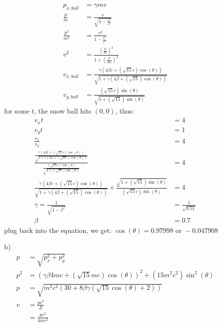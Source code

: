 \documentclass{article}
\begin{document}
\begin{itemize}
\begin{itemize}
        \begin{align*}
            p_{x,ball}&=\gamma mv\\
            \frac{p}{m}&=\frac{v}{\sqrt{1-\frac{v^2}{c^2}}}\\
            \frac{p^2}{m^2}&=\frac{v^2}{1-\frac{v^2}{c^2}}\\
            v^2&=\frac{\left(\frac{p}{m}\right)^2}{1+\left(\frac{p}{mc}\right)^2}\\
            v_{x,ball}&=\frac{\gamma\left(4\beta c+\left(\sqrt{15}c\right)\cos(\theta)\right)}{\sqrt{1+\gamma\left(4\beta+\left(\sqrt{15}\right)\cos(\theta)\right)}}\\
            v_{y,ball}&=\frac{\left(\sqrt{15}c\right)\sin(\theta)}{\sqrt{1+\left(\sqrt{15}\right)\sin(\theta)}}
        \end{align*}
        for some \(t\), the snow ball hits \((0,0)\), thus:
        \begin{align*}
            v_xt&=4\\
            v_yt&=1\\
            \frac{v_x}{v_y}&=4\\
            \frac{\frac{\gamma\left(4\beta c+\left(\sqrt{15}c\right)\cos(\theta)\right)}{\sqrt{1+\gamma\left(4\beta+\left(\sqrt{15}\right)\cos(\theta)\right)}}}{\frac{\left(\sqrt{15}c\right)\sin(\theta)}{\sqrt{1+\left(\sqrt{15}\right)\sin(\theta)}}}&=4\\
            \frac{\gamma\left(4\beta c+\left(\sqrt{15}c\right)\cos(\theta)\right)}{\sqrt{1+\gamma\left(4\beta+\left(\sqrt{15}\right)\cos(\theta)\right)}}\times \frac{\sqrt{1+\left(\sqrt{15}\right)\sin(\theta)}}{\left(\sqrt{15}c\right)\sin(\theta)}&=4\\
            \gamma=\frac{1}{\sqrt{1-\beta^2}}&=\frac{1}{\sqrt{0.51}}\\
            \beta&=0.7
        \end{align*}
        plug back into the equation, we get: 
        \(\cos(\theta)=0.97998 \text{ or } -0.047908\)
        \item [b)]
        \begin{align*}
            p&=\sqrt{p_x^2+p_y^2}\\
            p^2&=\left(\gamma\beta4mc+\left(\sqrt{15}mc\right)\cos(\theta)\right)^2+\left(15m^2c^2\right)\sin^2(\theta)\\
            p&=\sqrt{m^2c^2(30+8\beta\gamma(\sqrt{15}\cos(\theta)+2))}\\
            v&=\frac{pc^2}{E}\\
            &=\frac{pc^2}{4mc^2}\\

\end{align*}
\end{itemize}
\end{itemize}
\end{document}
